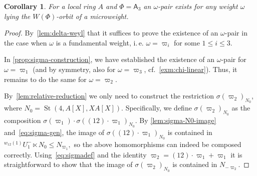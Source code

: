 \documentclass[oneside, 10pt]{amsart}
\DeclareMathOperator{\St}{St}
\newcommand{\rA}{\mathsf{A}}
\numberwithin{equation}{section}
\numberwithin{thm}{section}
\numberwithin{lemma}{section}
\newtheorem{cor}[thm]{Corollary}
\theoremstyle{definition}
\theoremstyle{remark}
\begin{document}
\begin{cor} \label{cor:a3-microweight}
For a local ring $A$ and $\Phi = \rA_3$ an $\omega$-pair exists for any weight $\omega$ lying the $W(\Phi)$-orbit of a microweight.
\end{cor}
\begin{proof}
By~\cref{lem:delta-weyl} that it suffices to prove the existence of an $\omega$-pair in the case when $\omega$ is a fundamental weight, i.\,e. $\omega = \varpi_{i}$ for some $1 \leq i \leq 3$.

In \cref{prop:sigma-construction}, we have established the existence of an $\omega$-pair for $\omega = \varpi_1$
(and by symmetry, also for $\omega = \varpi_3$, cf.~\cref{exm:chi-linear}).
Thus, it remains to do the same for $\omega = \varpi_{2}$.

By~\cref{lem:relative-reduction} we only need to construct the restriction $\sigma(\varpi_2)_{N_0}$, where $N_0 = \St(4, A[X], XA[X])$.
Specifically, we define $\sigma(\varpi_2)_{N_0}$ as the composition
$\sigma(\varpi_1) \cdot \sigma((12) \cdot \varpi_1)_{N_0}$.
By \cref{lem:sigma-N0-image} and~\eqref{eq:sigma-gen}, the image of $\sigma((12) \cdot \varpi_1)_{N_0}$ is contained in
${}^{w_{12}(1)}U_1^- \ltimes N_0 \leq N_{\varpi_1},$ so the above homomorphisms can indeed be composed correctly.
Using~\eqref{eq:sigmadef} and the identity
$\varpi_2 = (12) \cdot \varpi_1 + \varpi_1$ it is straightforward to show that the image of $\sigma(\varpi_2)_{N_0}$ is contained in $N_{-\varpi_2}$.
\end{proof}
\end{document}
